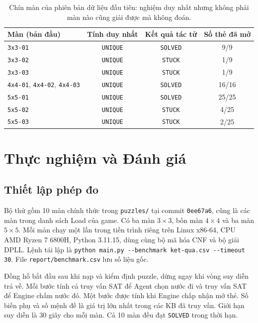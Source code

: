 \documentclass[12pt,a4paper]{article}
\begin{document}
    \begin{table}[H]
    \centering\small
    \begin{tabular}{@{}lccc@{}}
    \toprule
    \textbf{Màn (bản đầu)} & \textbf{Tính duy nhất} & \textbf{Kết quả tác tử} & \textbf{Số thẻ đã mở} \\
    \midrule
    \texttt{3x3-01} & \texttt{UNIQUE} & \texttt{SOLVED} & 9/9 \\
    \texttt{3x3-02} & \texttt{UNIQUE} & \texttt{STUCK} & 1/9 \\
    \texttt{3x3-03} & \texttt{UNIQUE} & \texttt{STUCK} & 1/9 \\
    \texttt{4x4-01}, \texttt{4x4-02}, \texttt{4x4-03} & \texttt{UNIQUE} & \texttt{SOLVED} & 16/16 \\
    \texttt{5x5-01} & \texttt{UNIQUE} & \texttt{SOLVED} & 25/25 \\
    \texttt{5x5-02} & \texttt{UNIQUE} & \texttt{STUCK} & 4/25 \\
    \texttt{5x5-03} & \texttt{UNIQUE} & \texttt{STUCK} & 2/25 \\
    \bottomrule
    \end{tabular}
    \caption{Chín màn của phiên bản dữ liệu đầu tiên: nghiệm duy nhất nhưng không phải màn nào cũng giải được mà không đoán.}
    \label{tab:legacy_puzzles}
    \end{table}


    \clearpage
    \section{Thực nghiệm và Đánh giá}
    \subsection{Thiết lập phép đo}
    Bộ thử gồm 10 màn chính thức trong \texttt{puzzles/} tại commit \texttt{0ee67a6}, cũng là các màn trong danh sách Load của game. Có ba màn $3\times3$, bốn màn $4\times4$ và ba màn $5\times5$. Mỗi màn chạy một lần trong tiến trình riêng trên Linux x86-64, CPU AMD Ryzen 7 6800H, Python 3.11.15, dùng cùng bộ mã hóa CNF và bộ giải DPLL. Lệnh tái lập là \verb|python main.py --benchmark ket-qua.csv --timeout 30|. File \texttt{report/benchmark.csv} lưu số liệu gốc.

    Đồng hồ bắt đầu sau khi nạp và kiểm định puzzle, dừng ngay khi vòng suy diễn trả về. Mỗi bước tính cả truy vấn SAT để Agent chọn nước đi và truy vấn SAT để Engine chấm nước đó. Một bước được tính khi Engine chấp nhận mở thẻ. Số biến phụ và số mệnh đề là giá trị lớn nhất trong các KB đã truy vấn. Giới hạn suy diễn là 30 giây cho mỗi màn. Cả 10 màn đều đạt \texttt{SOLVED} trong thời hạn.
\end{document}
